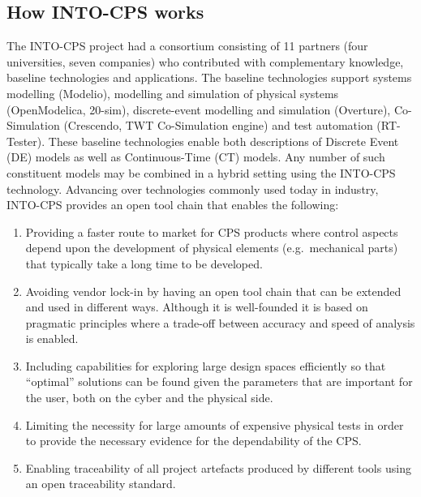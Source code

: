 \subsection{How INTO-CPS works}

The INTO-CPS project had a consortium consisting of 11 partners (four universities, seven companies) who contributed with complementary knowledge, baseline technologies and applications. The baseline technologies support systems modelling (Modelio), modelling and simulation of physical systems (OpenModelica, 20-sim), discrete-event modelling and simulation (Overture), Co-Simulation (Crescendo, TWT Co-Simulation engine) and test automation (RT-Tester). These baseline technologies enable both descriptions of Discrete Event (DE) models as well as Continuous-Time (CT) models. Any number of such constituent models may be combined in a hybrid setting using the INTO-CPS technology. Advancing over technologies commonly used today in industry, INTO-CPS provides an open tool chain that enables the following:

\begin{enumerate}
\item Providing a faster route to market for CPS products where control aspects depend upon the development of physical elements (e.g.\ mechanical parts) that typically take a long time to be developed.
\item Avoiding vendor lock-in by having an open tool chain that can be extended and used in different ways. Although it is well-founded it is based on pragmatic principles where a trade-off between accuracy and speed of analysis is enabled.
\item Including capabilities for exploring large design spaces efficiently so that ``optimal'' solutions can be found given the parameters that are important for the user, both on the cyber and the physical side.
\item Limiting the necessity for large amounts of expensive physical tests in order to provide the necessary evidence for the dependability of the CPS.
\item Enabling traceability of all project artefacts produced by different tools using an open traceability standard.
\end{enumerate}

